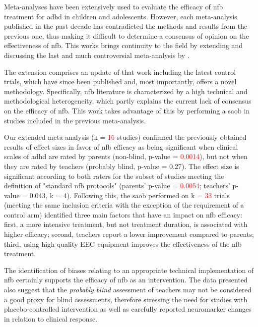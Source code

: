 

\noindent Meta-analyses have been extensively used to
evaluate the efficacy of \gls{nfb} treatment for \gls{adhd} in children and adolescents. 
However, each meta-analysis published in the past decade has contradicted the methods and
results from the previous one, thus making it difficult to determine a consensus of opinion
on the effectiveness of \gls{nfb}. This works brings continuity to the field by extending and discussing the last and much 
controversial meta-analysis by \citet{Cortese2016}. 

The extension comprises an update of that work including the latest control trials, 
which have since been published and, most importantly, offers a
novel methodology. Specifically, \gls{nfb} literature is characterized 
by a high technical and methodological heterogeneity, which partly explains the current lack of consensus on 
the efficacy of \gls{nfb}. This work takes advantage of this by performing a \gls{saob} in studies included in the previous meta-analysis.

Our extended meta-analysis (k = \textcolor{red}{16} studies) confirmed the previously
obtained results of effect sizes in favor of \gls{nfb} efficacy as being significant when clinical scales of \gls{adhd}
are rated by parents (non-blind, p-value = \textcolor{red}{0.0014}), but not when they are rated by
teachers (probably blind, p-value = 0.27). The effect size is significant
according to both raters for the subset of studies meeting the definition of
"standard \gls{nfb} protocols" (parents' p-value = \textcolor{red}{0.0054}; teachers' p-value = 0.043, k
= 4). Following this, the \gls{saob} performed on k = \textcolor{red}{33} trials (meeting the same inclusion
criteria with the exception of the requirement of a control arm)
identified three main factors that have an impact on \gls{nfb} efficacy: first, a more
intensive treatment, but not treatment duration, is associated with higher
efficacy; second, teachers report a lower improvement compared to parents;
third, using high-quality EEG equipment improves the effectiveness of the \gls{nfb} treatment.

The identification of biases relating to an appropriate technical implementation of \gls{nfb} 
certainly supports the efficacy of \gls{nfb} as an intervention. The data presented also suggest that the \emph{probably blind} 
assessment of teachers may not be considered a good proxy for blind assessments, therefore stressing the need for 
studies with placebo-controlled intervention as well as carefully reported neuromarker changes in relation to clinical response.



